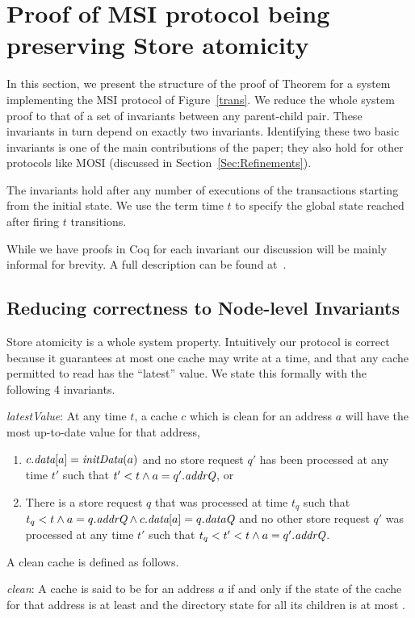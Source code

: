 \section{Proof of MSI protocol being preserving Store atomicity}
\label{Sec:Safety}

In this section, we present the structure of the proof of Theorem
 for a system implementing the MSI protocol of
Figure~\ref{trans}. We reduce the whole system proof to that of a set of
invariants between any parent-child pair. These invariants in turn depend on
exactly two invariants. Identifying these two basic invariants is one of the
main contributions of the paper; they also hold for other protocols like MOSI
(discussed in Section~\ref{Sec:Refinements}).

The invariants hold after any number of executions of the transactions starting
from the initial state. We use the term time $t$ to specify the global state
reached after firing $t$ transitions.

While we have proofs in Coq for each invariant our discussion will be mainly
informal for brevity. A full description can be found at~.

\subsection{Reducing correctness to Node-level Invariants}

Store atomicity is a whole system property. Intuitively our
protocol is correct because it guarantees at most one cache may
write at a time, and that any cache permitted to read has
the ``latest'' value. We state this formally with the following 4
invariants.

\begin{inv}
\textit{latestValue}:
At any time $t$, a cache $c$ which is clean for an address $a$ will have the most
up-to-date value for that address, \ie{}
\begin{enumerate}
\item $c.\textit{data}[a] = \textit{initData}(a)$ and no store request $q'$ has been processed at
any time $t'$ such that $t' < t \wedge a = q'.\textit{addrQ}$, or
\item There is a store request $q$ that was processed at time $t_q$ such that
$t_q < t \wedge a = q.\textit{addrQ} \wedge c.\textit{data}[a] = q.\textit{dataQ}$ and no other store
request $q'$ was processed at any time $t'$ such that $t_q < t' < t \wedge a =
q'.\textit{addrQ}$.
\end{enumerate}
\label{latestValue}
\end{inv}
A clean cache is defined as follows.
\begin{defn}
\textit{clean}: A cache is said to be \clean{} for an address $a$ if and only if
the state of the cache for that address is at least \Sh{} and the directory 
state for all its children is at most \Sh.
\end{defn}

